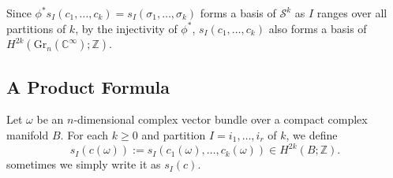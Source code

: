 Since $\phi^*s_I(c_1,\dots,c_k) = s_I(\sigma_1,\dots,\sigma_k)$ 
forms a basis of $\mathcal{S}^k$ as $I$ ranges over all partitions of $k$, 
by the injectivity of $\phi^*$, $s_I(c_1,\dots,c_k)$ also forms a basis of 
$H^{2k}(\mathrm{Gr}_n(\mathbb{C}^\infty);\mathbb{Z})$.

\subsection{A Product Formula}
Let $\omega$ be an $n$-dimensional complex vector bundle over
a compact complex manifold $B$. For each $k\geq0$ and partition 
$I=i_1,\dots,i_r$ of $k$, we define
\begin{equation*}
    s_I(c(\omega)) := s_I(c_1(\omega),\dots,c_k(\omega))\in
    H^{2k}(B;\mathbb{Z}).
\end{equation*}
sometimes we simply write it as $s_I(c)$. 

